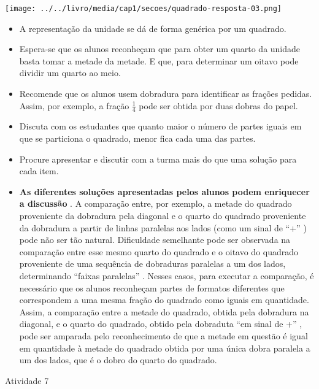 \documentclass[oneside]{book}
\begin{document}
\begin{multicols}{2}
    \texttt{[image: ../../livro/media/cap1/secoes/quadrado-resposta-03.png]}

\begin{itemize} %
    \item       A representação da unidade se dá de forma genérica por um quadrado.
    \item       Espera-se que os alunos reconheçam que para obter um quarto da unidade basta tomar a metade da metade. E que, para determinar um oitavo pode dividir um quarto ao meio.
    \item       Recomende que os alunos usem dobradura para identificar as frações pedidas. Assim, por exemplo, a fração       $\frac{1}{4}$       pode ser obtida por duas dobras do papel.
    \item       Discuta com os estudantes que quanto maior o número de partes iguais em que se particiona o quadrado, menor fica cada uma das partes.
    \item       Procure apresentar e discutir com a turma mais do que uma solução para cada item.
    \item             {\bf As diferentes soluções apresentadas pelos alunos podem enriquecer a discussão}      . A comparação entre, por exemplo, a metade do quadrado proveniente da dobradura pela diagonal e o quarto do quadrado proveniente da dobradura a partir de linhas paralelas aos lados (como um sinal de       ``+''      ) pode não ser tão natural. Dificuldade semelhante pode ser observada na comparação entre esse mesmo quarto do quadrado e o oitavo do quadrado proveniente de uma sequência de dobraduras paralelas a um dos lados, determinando       ``faixas paralelas''      . Nesses casos, para executar a comparação, é necessário que os alunos reconheçam partes de formatos diferentes que correspondem a uma mesma fração do quadrado como iguais em quantidade. Assim, a comparação entre a metade do quadrado, obtida pela dobradura na diagonal, e o quarto do quadrado, obtido pela dobraduta       ``em sinal de +''      , pode ser amparada pelo reconhecimento de que a metade em questão é igual em quantidade à metade do quadrado obtida por uma única dobra paralela a um dos lados, que é o dobro do quarto do quadrado.
\end{itemize} %








\begin{resposta*}{Atividade 7}


\end{resposta*}
\end{multicols}
\end{document}
